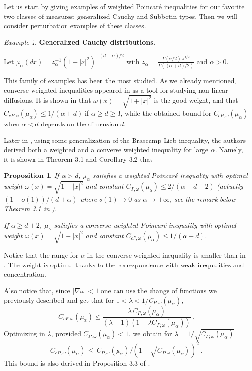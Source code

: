 \documentclass[11pt,reqno]{amsart}
\numberwithin{equation}{section}
\newtheorem{proposition}[theorem]{Proposition}
\theoremstyle{definition}
\theoremstyle{remark}
\newtheorem{example}[theorem]{Example}
\begin{document}
Let us start by giving examples of weighted Poincar\'e inequalities for our favorite two classes of measures: generalized Cauchy and Subbotin types. Then we will consider perturbation examples of these classes.
\begin{example}\label{exwPcauchy}
 \textbf{Generalized Cauchy distributions.}  

Let $\mu_\alpha(dx)=z_\alpha^{-1} (1+|x|^2)^{-(d+\alpha)/2}$ with $z_\alpha= \frac{\Gamma(\alpha/2) \, \pi^{d/2}}{\Gamma((\alpha+d)/2)}$ and $\alpha>0$.


This family of examples has been the most studied. As we already mentioned, converse weighted inequalities appeared in \cite{DMC,Adrienetal} as a tool for studying non linear diffusions. It is shown in \cite{Adrienetal} that $\omega(x)=\sqrt{1+|x|^2}$ is the good weight, and that $C_{cP,\omega}(\mu_\alpha)\leq 1/(\alpha+d)$ if $\alpha \geq d \geq 3$, while the obtained bound for $C_{cP,\omega}(\mu_\alpha)$ when $\alpha <d$ depends on the dimension $d$.

Later in \cite{BLweight}, using some generalization of the Brascamp-Lieb inequality, the authors derived both a weighted and a converse weighted inequality for large $\alpha$. Namely, it is shown in \cite{BLweight} Theorem 3.1 and Corollary 3.2 that
\begin{proposition}\label{propweightpoinccauchy}
If $\alpha>d$, $\mu_\alpha$ satisfies a weighted Poincar\'e inequality with optimal weight $\omega(x)=\sqrt{1+|x|^2}$ and constant $C_{P,\omega}(\mu_\alpha) \leq 2/(\alpha+d-2)$ (actually $(1+o(1))/(d+\alpha)$ where $o(1) \to 0$ as $\alpha \to +\infty$, see the remark below Theorem 3.1 in \cite{BLweight}).

If $\alpha \geq d+2$, $\mu_\alpha$ satisfies a converse weighted Poincar\'e inequality with optimal weight $\omega(x)=\sqrt{1+|x|^2}$ and constant $C_{cP,\omega}(\mu_\alpha)\leq 1/(\alpha+d)$.
\end{proposition}
Notice that the range for $\alpha$ in the converse weighted inequality is smaller than in \cite{Adrienetal}. The weight is optimal thanks to the correspondence with weak inequalities and concentration.

Also notice that, since $|\nabla \omega|<1$ one can use the change of functions we previously described and get that for $1<\lambda<1/C_{P,\omega}(\mu_\alpha)$, $$C_{cP,\omega}(\mu_\alpha)\leq \frac{\lambda \, C_{P,\omega}(\mu_\alpha)}{(\lambda -1)(1-\lambda C_{P,\omega}(\mu_\alpha))} \, .$$ Optimizing in $\lambda$, provided $C_{P,\omega}(\mu_\alpha) < 1$, we obtain for $\lambda=1/\sqrt{C_{P,\omega}(\mu_\alpha)}$, 
\begin{equation}\label{eqcaucwptrick}
C_{cP,\omega}(\mu_\alpha) \, \leq \, C_{P,\omega}(\mu_\alpha)/(1-\sqrt{C_{P,\omega}(\mu_\alpha)})^2 \, .
\end{equation}
This bound is also derived in Proposition 3.3 of \cite{BLweight}.



\end{example}
\end{document}

